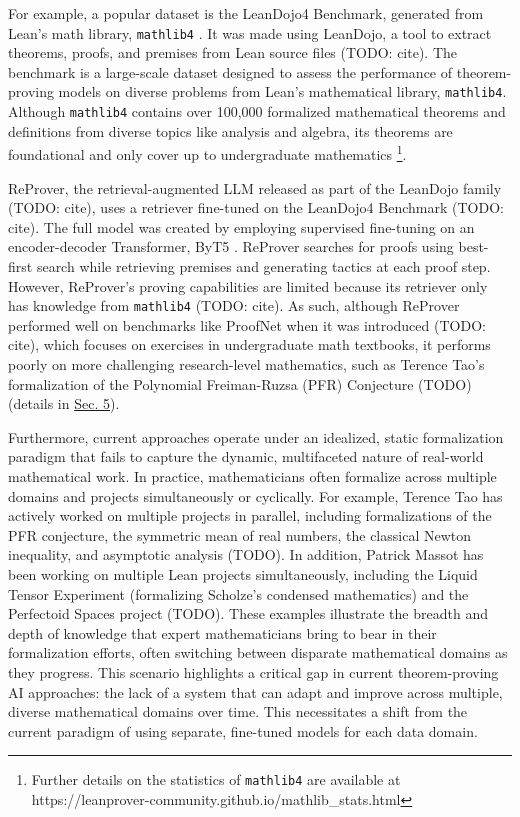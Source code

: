 \documentclass{article} %
\begin{document}
For example, a popular dataset is the LeanDojo4 Benchmark, generated from Lean's math library, \texttt{mathlib4} \citep{communityLeanprovercommunityMathlib42024}. It was made using LeanDojo, a tool to extract theorems, proofs, and premises from Lean source files (TODO: cite). The benchmark is a large-scale dataset designed to assess the performance of theorem-proving models on diverse problems from Lean's mathematical library, \texttt{mathlib4}. Although \texttt{mathlib4} contains over 100,000 formalized mathematical theorems and definitions from diverse topics like analysis and algebra, its theorems are foundational and only cover up to undergraduate mathematics \footnote{Further details on the statistics of \texttt{mathlib4} are available at https://leanprover-community.github.io/mathlib\_stats.html}.

ReProver, the retrieval-augmented LLM released as part of the LeanDojo family (TODO: cite), uses a retriever fine-tuned on the LeanDojo4 Benchmark (TODO: cite). The full model was created by employing supervised fine-tuning on an encoder-decoder Transformer, ByT5 \citep{xueByT5TokenFreeFuture2022}. ReProver searches for proofs using best-first search while retrieving premises and generating tactics at each proof step. However, ReProver's proving capabilities are limited because its retriever only has knowledge from \texttt{mathlib4} (TODO: cite). As such, although ReProver performed well on benchmarks like ProofNet when it was introduced (TODO: cite), which focuses on exercises in undergraduate math textbooks, it performs poorly on more challenging research-level mathematics, such as Terence Tao's formalization of the Polynomial Freiman-Ruzsa (PFR) Conjecture (TODO) (details in \hyperref[sec:experiments]{Sec. 5}).

Furthermore, current approaches operate under an idealized, static formalization paradigm that fails to capture the dynamic, multifaceted nature of real-world mathematical work. In practice, mathematicians often formalize across multiple domains and projects simultaneously or cyclically. For example, Terence Tao has actively worked on multiple projects in parallel, including formalizations of the PFR conjecture, the symmetric mean of real numbers, the classical Newton inequality, and asymptotic analysis (TODO). In addition, Patrick Massot has been working on multiple Lean projects simultaneously, including the Liquid Tensor Experiment (formalizing Scholze's condensed mathematics) and the Perfectoid Spaces project (TODO). These examples illustrate the breadth and depth of knowledge that expert mathematicians bring to bear in their formalization efforts, often switching between disparate mathematical domains as they progress. This scenario highlights a critical gap in current theorem-proving AI approaches: the lack of a system that can adapt and improve across multiple, diverse mathematical domains over time. This necessitates a shift from the current paradigm of using separate, fine-tuned models for each data domain.
\end{document}
